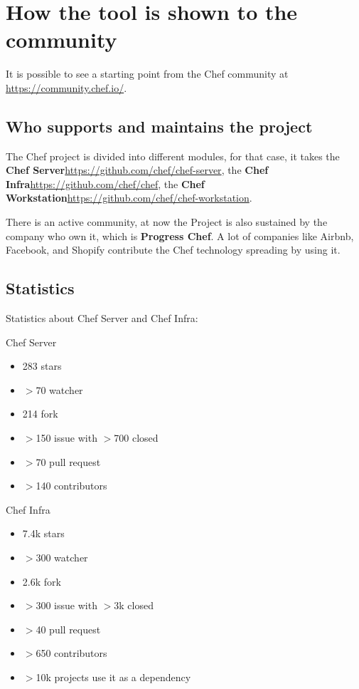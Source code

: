\documentclass[12pt,a4paper,openright,twoside]{book}
\begin{document}
\section{How the tool is shown to the community}
It is possible to see a starting point from the Chef community at \url{https://community.chef.io/}.

\subsection{Who supports and maintains the project}
The Chef project is divided into different modules, for that case, it takes the \textbf{Chef Server}\url{https://github.com/chef/chef-server},
the \textbf{Chef Infra}\url{https://github.com/chef/chef}, the \textbf{Chef Workstation}\url{https://github.com/chef/chef-workstation}.

There is an active community, at now the Project is also sustained by the company who own it, which is \textbf{Progress Chef}.
A lot of companies like Airbnb, Facebook, and Shopify contribute the Chef technology spreading by using it.

\subsection{Statistics}
Statistics about Chef Server and Chef Infra:


Chef Server


\begin{itemize}
    \item 283 stars
    \item $>$70 watcher
    \item 214 fork
    \item $>$150 issue with $>$700 closed
    \item $>$70 pull request
    \item $>$140 contributors
\end{itemize}


Chef Infra


\begin{itemize}
    \item 7.4k stars
    \item $>$300 watcher
    \item 2.6k fork
    \item $>$300 issue with $>$3k closed
    \item $>$40 pull request
    \item $>$650 contributors
    \item $>$10k projects use it as a dependency
\end{itemize}
\end{document}
